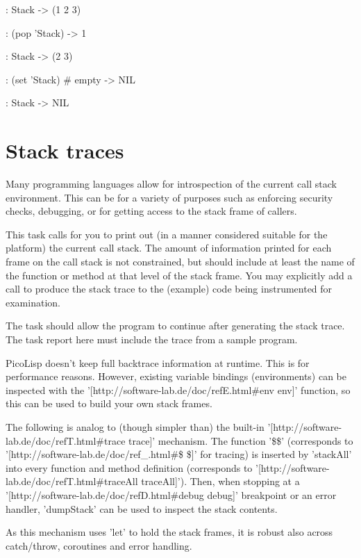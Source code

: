 \begin{itemize}
\begin{wideverbatim}
: Stack
-> (1 2 3)

: (pop 'Stack)
-> 1

: Stack
-> (2 3)

: (set 'Stack)  # empty
-> NIL

: Stack
-> NIL

\end{wideverbatim}

\pagebreak{}
\section*{Stack traces}

Many programming languages allow for introspection of the current call
stack environment. This can be for a variety of purposes such as
enforcing security checks, debugging, or for getting access to the stack
frame of callers.

This task calls for you to print out (in a manner considered suitable
for the platform) the current call stack. The amount of information
printed for each frame on the call stack is not constrained, but should
include at least the name of the function or method at that level of the
stack frame. You may explicitly add a call to produce the stack trace to
the (example) code being instrumented for examination.

The task should allow the program to continue after generating the stack
trace. The task report here must include the trace from a sample
program. 

\begin{wideverbatim}

PicoLisp doesn't keep full backtrace information at runtime. This is for
performance reasons. However, existing variable bindings (environments) can be
inspected with the '[http://software-lab.de/doc/refE.html#env env]' function, so
this can be used to build your own stack frames.

The following is analog to (though simpler than) the built-in
'[http://software-lab.de/doc/refT.html#trace trace]' mechanism. The function
'\$\$' (corresponds to '[http://software-lab.de/doc/ref_.html#\$ \$]' for tracing)
is inserted by 'stackAll' into every function and method definition
(corresponds to '[http://software-lab.de/doc/refT.html#traceAll traceAll]').
Then, when stopping at a '[http://software-lab.de/doc/refD.html#debug debug]'
breakpoint or an error handler, 'dumpStack' can be used to inspect the stack
contents.

As this mechanism uses 'let' to hold the stack frames, it is robust also across
catch/throw, coroutines and error handling.


\end{wideverbatim}
\end{itemize}
